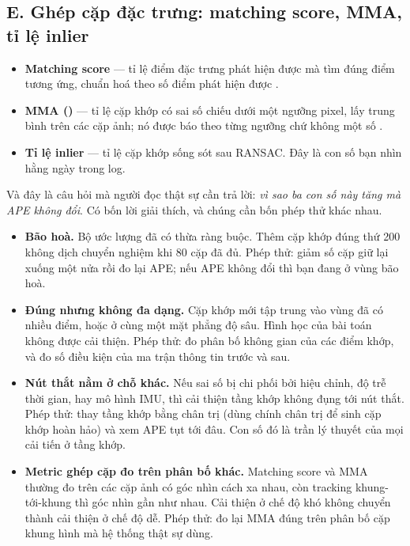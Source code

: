 \documentclass[../../deep_learning.tex]{subfiles}
\begin{document}
\subsection{E. Ghép cặp đặc trưng: matching score, MMA, tỉ lệ inlier}
\begin{itemize}
\item \textbf{Matching score} --- tỉ lệ điểm đặc trưng phát hiện được mà tìm đúng điểm tương ứng, chuẩn hoá theo số điểm phát hiện được \cite{mikolajczyk2005descriptors}.
\item \textbf{MMA ()} --- tỉ lệ cặp khớp có sai số chiếu dưới một ngưỡng pixel, lấy trung bình trên các cặp ảnh; nó được báo theo từng ngưỡng chứ không một số \cite{dusmanu2019d2net}.
\item \textbf{Tỉ lệ inlier} --- tỉ lệ cặp khớp sống sót sau RANSAC. Đây là con số bạn nhìn hằng ngày trong log.
\end{itemize}

Và đây là câu hỏi mà người đọc thật sự cần trả lời: \emph{vì sao ba con số này tăng mà APE không đổi}. Có bốn lời giải thích, và chúng cần bốn phép thử khác nhau.

\begin{itemize}
\item \textbf{Bão hoà.} Bộ ước lượng đã có thừa ràng buộc. Thêm cặp khớp đúng thứ 200 không dịch chuyển nghiệm khi 80 cặp đã đủ. Phép thử: giảm số cặp giữ lại xuống một nửa rồi đo lại APE; nếu APE không đổi thì bạn đang ở vùng bão hoà.
\item \textbf{Đúng nhưng không đa dạng.} Cặp khớp mới tập trung vào vùng đã có nhiều điểm, hoặc ở cùng một mặt phẳng độ sâu. Hình học của bài toán không được cải thiện. Phép thử: đo phân bố không gian của các điểm khớp, và đo số điều kiện của ma trận thông tin trước và sau.
\item \textbf{Nút thắt nằm ở chỗ khác.} Nếu sai số bị chi phối bởi hiệu chỉnh, độ trễ thời gian, hay mô hình IMU, thì cải thiện tầng khớp không đụng tới nút thắt. Phép thử: thay tầng khớp bằng chân trị (dùng chính chân trị để sinh cặp khớp hoàn hảo) và xem APE tụt tới đâu. Con số đó là trần lý thuyết của mọi cải tiến ở tầng khớp.
\item \textbf{Metric ghép cặp đo trên phân bố khác.} Matching score và MMA thường đo trên các cặp ảnh có góc nhìn cách xa nhau, còn tracking khung-tới-khung thì góc nhìn gần như nhau. Cải thiện ở chế độ khó không chuyển thành cải thiện ở chế độ dễ. Phép thử: đo lại MMA đúng trên phân bố cặp khung hình mà hệ thống thật sự dùng.
\end{itemize}
\end{document}
